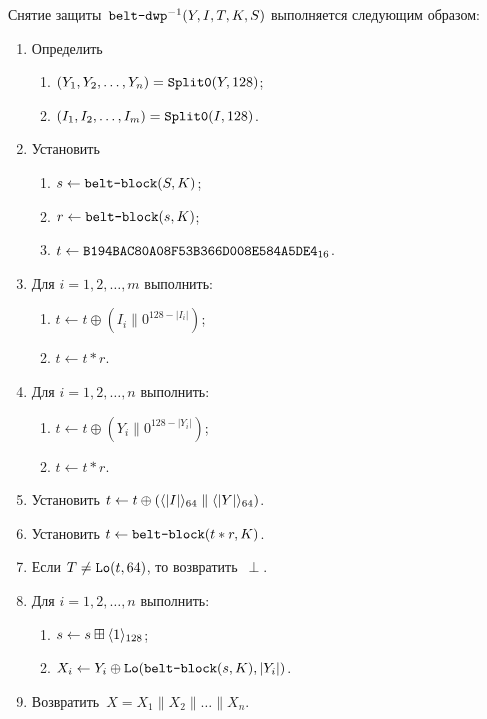 Снятие защиты~$\texttt{belt-dwp}^{-1}(Y,I,T,K,S)$ выполняется следующим образом:
\begin{enumerate}
\item
Определить 
\begin{enumerate}
\item
$(Y_1,Y_2,\ldots,Y_n)=\mathop{\texttt{Split0}}\nolimits(Y, 128)$;
\item
$(I_1,I_2,\ldots,I_m)=\mathop{\texttt{Split0}}\nolimits(I, 128)$. 
\end{enumerate}
\item
Установить
\begin{enumerate}
\item
$s\leftarrow\texttt{belt-block}(S,K)$;
\item
$r\leftarrow \texttt{belt-block}(s,K)$;
\item
$t\leftarrow\texttt{B194BAC80A08F53B366D008E584A5DE4}_{16}$.
\end{enumerate}

\item
Для $i=1,2,\ldots,m$ выполнить:
\begin{enumerate}
\item
$t\leftarrow t\oplus (I_i\parallel 0^{128-|I_i|})$;
\item
$t\leftarrow t\ast r$.
\end{enumerate}

\item\label{Step.AE.DWP.StepA}
Для $i=1,2,\ldots,n$ выполнить:
\begin{enumerate}
\item
$t\leftarrow t\oplus (Y_i\parallel 0^{128-|Y_i|})$;
\item
$t\leftarrow t\ast r$.
\end{enumerate}

\item
Установить
$t\leftarrow t\oplus 
(\langle|I|\rangle_{64}\parallel\langle|Y|\rangle_{64})$.

\item
Установить
$t\leftarrow \texttt{belt-block}(t\ast r,K)$.

\item\label{Step.AE.DWP.VerifyMAC}
Если $T\neq \mathop{\texttt{Lo}}\nolimits(t, 64)$, то возвратить~$\perp$.

\item\label{Step.AE.DWP.StepD}
Для $i=1,2,\ldots,n$ выполнить:
\begin{enumerate}
\item
$s\leftarrow s\boxplus\langle1\rangle_{128}$;
\item
$X_i\leftarrow Y_i\oplus \mathop{\texttt{Lo}}\nolimits(\texttt{belt-block}(s,K),|Y_i|)$.
\end{enumerate}

\item
Возвратить~$X=X_1\parallel X_2\parallel\ldots\parallel X_n$.
\end{enumerate}

